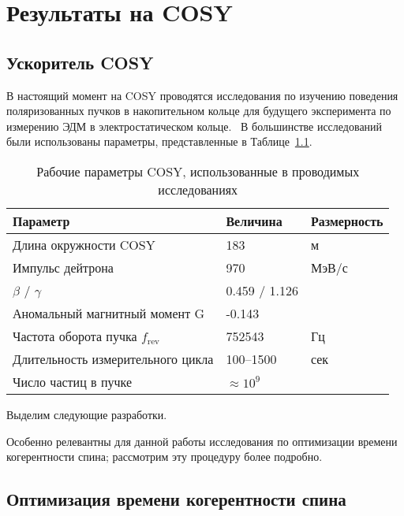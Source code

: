 \chapter{Результаты на COSY}\label{chpt4:top-level}

\section{Ускоритель COSY}


В настоящий момент на COSY проводятся исследования по изучению поведения поляризованных пучков в накопительном кольце для будущего эксперимента по измерению ЭДМ в электростатическом кольце.~\cite{Lehrach:Precursor2012, Lehrach:IPAC15, COSY:SpinTuneMapping, Eversmann:SpinTuneMeasurement, COSY:SCT:1000sec, Wagner:BBA2018}
В большинстве исследований были использованы параметры, представленные в Таблице~\ref{tbl:COSY-studies}.

\begin{table}[h]\centering\captionsetup{width=.9\linewidth}
	\caption{Рабочие параметры COSY, использованные в проводимых исследованиях\label{tbl:COSY-studies}}
	\begin{tabular}{lll}
		\toprule
		Параметр & Величина & Размерность \\
		\midrule
		Длина окружности COSY& 183 & м\\
		Импульс дейтрона & 970 & МэВ/с \\
		 $\beta$ / $\gamma$ & 0.459 / 1.126 & \\
		 Аномальный магнитный момент G& -0.143& \\
		 Частота оборота пучка $f_{\mathrm{rev}}$& 752543& Гц\\
		 Длительность измерительного цикла& 100--1500& сек\\
		 Число частиц в пучке & $\approx 10^9$& \\
		 \bottomrule
	\end{tabular}
\end{table}

Выделим следующие разработки.


Особенно релевантны для данной работы исследования по оптимизации времени когерентности спина; рассмотрим эту процедуру более подробно.
\section{Оптимизация времени когерентности спина}\label{sec:COSY:SCT-optimization}



\clearpage

